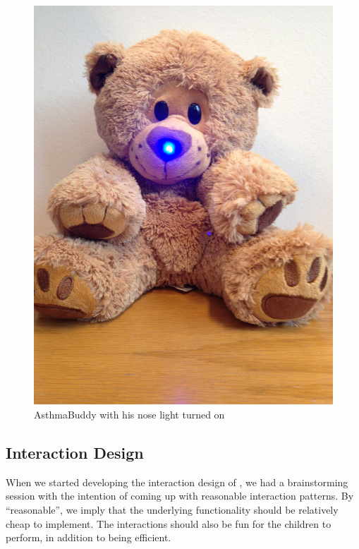 \begin{figure}[H]
\begin{minipage}[t]{0.4\linewidth}
			\includegraphics[width=0.3\paperwidth]{Pictures/abbluelight.jpg}
		\caption{AsthmaBuddy with his nose light turned on}
		\label{fig:asthmabuddyandlightnose}
	\end{minipage}
\end{figure}


\subsection{Interaction Design}
\label{sec:interactiondesign}
When we started developing the interaction design of \buddy{}, we had a brainstorming session with the intention of coming up with reasonable interaction patterns.        
By ``reasonable'', we imply that the underlying functionality should be relatively cheap to implement. The interactions should also be fun for the children to perform, in addition to being efficient.  

